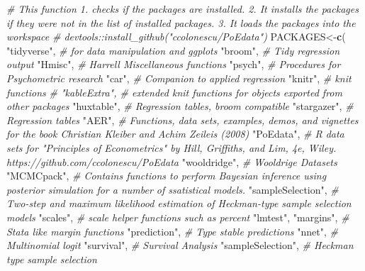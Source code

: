 \documentclass[]{book}
\newenvironment{Shaded}{\begin{snugshade}}{\end{snugshade}}
\newcommand{\CommentTok}[1]{\textcolor[rgb]{0.56,0.35,0.01}{\textit{#1}}}
\newcommand{\KeywordTok}[1]{\textcolor[rgb]{0.13,0.29,0.53}{\textbf{#1}}}
\newcommand{\NormalTok}[1]{#1}
\newcommand{\StringTok}[1]{\textcolor[rgb]{0.31,0.60,0.02}{#1}}
\begin{document}
\begin{Shaded}
\begin{Highlighting}[]
\CommentTok{# This function 1. checks if the packages are installed. 2. It installs the packages if they were not in the list of installed packages. 3. It loads the packages into the workspace}
\CommentTok{# devtools::install_github("ccolonescu/PoEdata")}
\NormalTok{PACKAGES<-}\KeywordTok{c}\NormalTok{(}
            \StringTok{"tidyverse"}\NormalTok{,  }\CommentTok{# for data manipulation and ggplots}
            \StringTok{"broom"}\NormalTok{,  }\CommentTok{# Tidy regression output}
            \StringTok{"Hmisc"}\NormalTok{, }\CommentTok{# Harrell Miscellaneous functions}
            \StringTok{"psych"}\NormalTok{, }\CommentTok{# Procedures for Psychometric research}
            \StringTok{"car"}\NormalTok{, }\CommentTok{# Companion to applied regression}
            \StringTok{"knitr"}\NormalTok{, }\CommentTok{# knit functions}
            \CommentTok{# "kableExtra", # extended knit functions for objects exported from other packages}
            \StringTok{"huxtable"}\NormalTok{, }\CommentTok{#  Regression tables, broom compatible}
            \StringTok{"stargazer"}\NormalTok{, }\CommentTok{# Regression tables}
            \StringTok{"AER"}\NormalTok{, }\CommentTok{#  Functions, data sets, examples, demos, and vignettes for the book Christian Kleiber and Achim Zeileis (2008)}
            \StringTok{"PoEdata"}\NormalTok{, }\CommentTok{# R data sets for "Principles of Econometrics" by Hill, Griffiths, and Lim, 4e, Wiley. https://github.com/ccolonescu/PoEdata}
            \StringTok{"wooldridge"}\NormalTok{,  }\CommentTok{# Wooldrige Datasets}
            \StringTok{"MCMCpack"}\NormalTok{, }\CommentTok{# Contains functions to perform Bayesian inference using posterior simulation for a number of ssatistical models.}
            \StringTok{"sampleSelection"}\NormalTok{, }\CommentTok{# Two-step and maximum likelihood estimation of Heckman-type sample selection models}
            \StringTok{"scales"}\NormalTok{, }\CommentTok{# scale helper functions such as percent }
            \StringTok{"lmtest"}\NormalTok{, }
            \StringTok{"margins"}\NormalTok{, }\CommentTok{# Stata like margin functions}
            \StringTok{"prediction"}\NormalTok{, }\CommentTok{# Type stable predictions}
            \StringTok{"nnet"}\NormalTok{, }\CommentTok{# Multinomial logit}
            \StringTok{"survival"}\NormalTok{, }\CommentTok{# Survival Analysis}
            \StringTok{"sampleSelection"}\NormalTok{, }\CommentTok{# Heckman type sample selection}

\end{Highlighting}
\end{Shaded}
\end{document}
